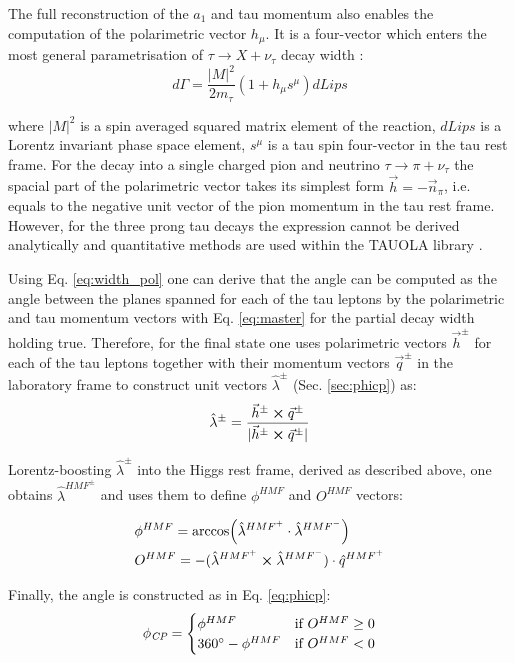 The full reconstruction of the $a_1$ and tau momentum also enables the computation of the polarimetric vector $h_\mu$. It is a four-vector which enters the most general parametrisation of $\tau \to X + \nu_\tau$ decay width \cite{Davier:1992nw,Kuhn:1992nz}:
\begin{equation}\label{eq:width_pol}
    d\Gamma = \dfrac{|M|^2}{2m_\tau}(1+h_\mu s^\mu)dLips
\end{equation}

where $|M|^2$ is a spin averaged squared matrix element of the reaction, $dLips$ is a Lorentz invariant phase space element, $s^\mu$ is a tau spin four-vector in the tau rest frame. For the decay into a single charged pion and neutrino $\tau \to \pi + \nu_\tau$ the spacial part of the polarimetric vector takes its simplest form $\vec{h} = -\vec{n}_\pi$, i.e. equals to the negative unit vector of the pion momentum in the tau rest frame. However, for the three prong tau decays the expression cannot be derived analytically and quantitative methods are used within the TAUOLA library \cite{Jadach:1990mz,Jezabek:1991qp,Jadach:1993hs}.

Using Eq. \ref{eq:width_pol} one can derive that the \phicp angle can be computed as the angle between the planes spanned for each of the tau leptons by the polarimetric and tau momentum vectors with Eq. \ref{eq:master} for the partial decay width holding true. Therefore, for the \aaa final state one uses polarimetric vectors $\vec{h}^\pm$ for each of the tau leptons together with their momentum vectors $\vec{q}^\pm$ in the laboratory frame to construct unit vectors $\hat{\lambda}^{\pm}$ (Sec. \ref{sec:phicp}) as:
\begin{equation}
    \hat{\lambda}^\pm = \dfrac{\vec{h}^\pm \cross \vec{q}^\pm}{|\vec{h}^\pm \cross \vec{q}^\pm|}
\end{equation}

Lorentz-boosting $\hat{\lambda}^{\pm}$ into the Higgs rest frame, derived as described above, one obtains $\hat{\lambda}^{HMF^\pm}$ and uses them to define $\phi^{HMF}$ and $O^{HMF}$ vectors:

\begin{align}
    &\phi^{HMF} = \arccos(\hat{\lambda}^{HMF^+} \cdot \hat{\lambda}^{HMF^-})\\
    &O^{HMF} = - (\hat{\lambda}^{HMF^+} \cross \hat{\lambda}^{HMF^-}) \cdot \hat{q}^{HMF^+}
\end{align}

Finally, the \phicp angle is constructed as in Eq. \ref{eq:phicp}:
\begin{equation}
    \phi_{\textit{CP}} = 
    \begin{cases}
    \phi^{HMF} & \text{if} ~O^{HMF} \geq 0 \\
    360^\circ - \phi^{HMF} & \text{if} ~O^{HMF} < 0
    \end{cases}
\end{equation}

